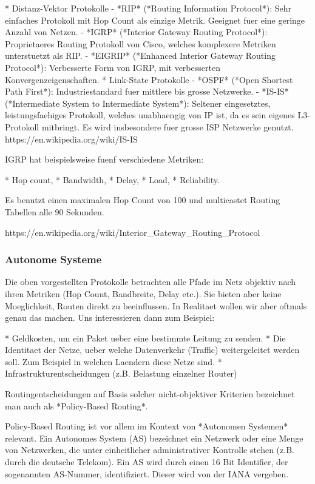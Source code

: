 * Distanz-Vektor Protokolle
  - *RIP* (*Routing Information Protocol*): Sehr einfaches Protokoll mit Hop
    Count als einzige Metrik. Geeignet fuer eine geringe Anzahl von Netzen.
  - *IGRP* (*Interior Gateway Routing Protocol*): Proprietaeres Routing
    Protokoll von Cisco, welches komplexere Metriken unterstuetzt als RIP.
  - *EIGRIP* (*Enhanced Interior Gateway Routing Protocol*): Verbesserte Form
    von IGRP, mit verbesserten Konvergenzeigenschaften.
* Link-State Protokolle
  - *OSPF* (*Open Shortest Path First*): Industriestandard fuer mittlere bis
    grosse Netzwerke.
  - *IS-IS* (*Intermediate System to Intermediate System*): Seltener
    eingesetztes, leistungsfaehiges Protokoll, welches unabhaengig von IP ist,
    da es sein eigenes L3-Protokoll mitbringt. Es wird insbesondere fuer grosse
    ISP Netzwerke genutzt. https://en.wikipedia.org/wiki/IS-IS

IGRP hat beispielsweise fuenf verschiedene Metriken:

* Hop count,
* Bandwidth,
* Delay,
* Load,
* Reliability.

Es benutzt einen maximalen Hop Count von 100 und multicastet Routing Tabellen
alle 90 Sekunden.

https://en.wikipedia.org/wiki/Interior\_Gateway\_Routing\_Protocol

\subsubsection{Autonome Systeme} 

Die oben vorgestellten Protokolle betrachten alle Pfade im Netz objektiv nach
ihren Metriken (Hop Count, Bandbreite, Delay etc.). Sie bieten aber keine
Moeglichkeit, Routen direkt zu beeinflussen. In Realitaet wollen wir aber
oftmals genau das machen. Uns interessieren dann zum Beispiel:

* Geldkosten, um ein Paket ueber eine bestimmte Leitung zu senden.
* Die Identitaet der Netze, ueber welche Datenverkehr (Traffic) weitergeleitet
  werden soll. Zum Beispiel in welchen Laendern diese Netze sind.
* Infrastrukturentscheidungen (z.B. Belastung einzelner Router)

Routingentscheidungen auf Basis solcher nicht-objektiver Kriterien bezeichnet
man auch als *Policy-Based Routing*.

Policy-Based Routing ist vor allem im Kontext von *Autonomen Systemen*
relevant. Ein Autonomes System (AS) bezeichnet ein Netzwerk oder eine Menge von
Netzwerken, die unter einheitlicher administrativer Kontrolle stehen (z.B. durch
die deutsche Telekom). Ein AS wird durch einen 16 Bit Identifier, der
sogenannten AS-Nummer, identifiziert. Dieser wird von der IANA vergeben.

